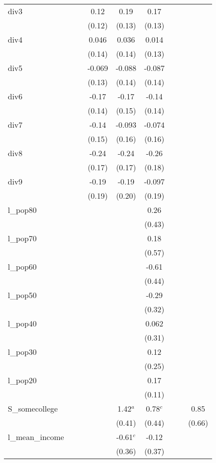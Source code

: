 \documentclass[]{article}
\begin{document}
\begin{tabular}{lcccccccc}
div3 &  &  & 0.12 & 0.19 & 0.17 &  &  &  \\
 &  &  & (0.12) & (0.13) & (0.13) &  &  &  \\
div4 &  &  & 0.046 & 0.036 & 0.014 &  &  &  \\
 &  &  & (0.14) & (0.14) & (0.13) &  &  &  \\
div5 &  &  & -0.069 & -0.088 & -0.087 &  &  &  \\
 &  &  & (0.13) & (0.14) & (0.14) &  &  &  \\
div6 &  &  & -0.17 & -0.17 & -0.14 &  &  &  \\
 &  &  & (0.14) & (0.15) & (0.14) &  &  &  \\
div7 &  &  & -0.14 & -0.093 & -0.074 &  &  &  \\
 &  &  & (0.15) & (0.16) & (0.16) &  &  &  \\
div8 &  &  & -0.24 & -0.24 & -0.26 &  &  &  \\
 &  &  & (0.17) & (0.17) & (0.18) &  &  &  \\
div9 &  &  & -0.19 & -0.19 & -0.097 &  &  &  \\
 &  &  & (0.19) & (0.20) & (0.19) &  &  &  \\
l\_pop80 &  &  &  &  & 0.26 &  &  &  \\
 &  &  &  &  & (0.43) &  &  &  \\
l\_pop70 &  &  &  &  & 0.18 &  &  &  \\
 &  &  &  &  & (0.57) &  &  &  \\
l\_pop60 &  &  &  &  & -0.61 &  &  &  \\
 &  &  &  &  & (0.44) &  &  &  \\
l\_pop50 &  &  &  &  & -0.29 &  &  &  \\
 &  &  &  &  & (0.32) &  &  &  \\
l\_pop40 &  &  &  &  & 0.062 &  &  &  \\
 &  &  &  &  & (0.31) &  &  &  \\
l\_pop30 &  &  &  &  & 0.12 &  &  &  \\
 &  &  &  &  & (0.25) &  &  &  \\
l\_pop20 &  &  &  &  & 0.17 &  &  &  \\
 &  &  &  &  & (0.11) &  &  &  \\
S\_somecollege &  &  &  & 1.42$^a$ & 0.78$^c$ &  &  & 0.85 \\
 &  &  &  & (0.41) & (0.44) &  &  & (0.66) \\
l\_mean\_income &  &  &  & -0.61$^c$ & -0.12 &  &  &  \\
 &  &  &  & (0.36) & (0.37) &  &  &  \\

\end{tabular}
\end{document}
